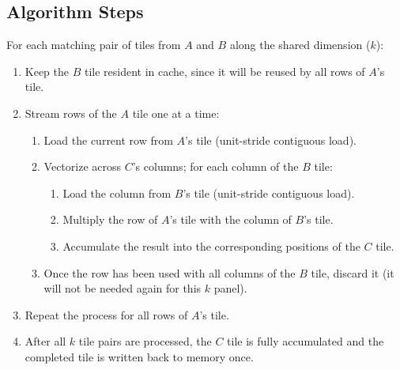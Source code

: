 \documentclass[a4 paper]{article}
\begin{document}
\subsection*{Algorithm Steps}
For each matching pair of tiles from $A$ and $B$ along the shared dimension ($k$):
\begin{enumerate}
    \item Keep the $B$ tile resident in cache, since it will be reused by all rows of $A$'s tile.
    \item Stream rows of the $A$ tile one at a time:
    \begin{enumerate}
        \item Load the current row from $A$’s tile (unit-stride contiguous load).
        \item Vectorize across $C$’s columns; for each column of the $B$ tile:
        \begin{enumerate}
            \item Load the column from $B$’s tile (unit-stride contiguous load).
            \item Multiply the row of $A$’s tile with the column of $B$’s tile.
            \item Accumulate the result into the corresponding positions of the $C$ tile.
        \end{enumerate}
        \item Once the row has been used with all columns of the $B$ tile, discard it (it will not be needed again for this $k$ panel).
    \end{enumerate}
    \item Repeat the process for all rows of $A$’s tile.
    \item After all $k$ tile pairs are processed, the $C$ tile is fully accumulated and the completed tile is written back to memory once.
\end{enumerate}
\end{document}
